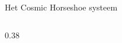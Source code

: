 \documentclass[aspectratio=169,xcolor=dvipsnames]{beamer}
\begin{document}
\begin{frame}{Het Cosmic Horseshoe systeem}
\begin{columns}[T]
        \begin{column}{0.38\textwidth}
        \end{column}
        
    \end{columns}
\end{frame}
\end{document}
